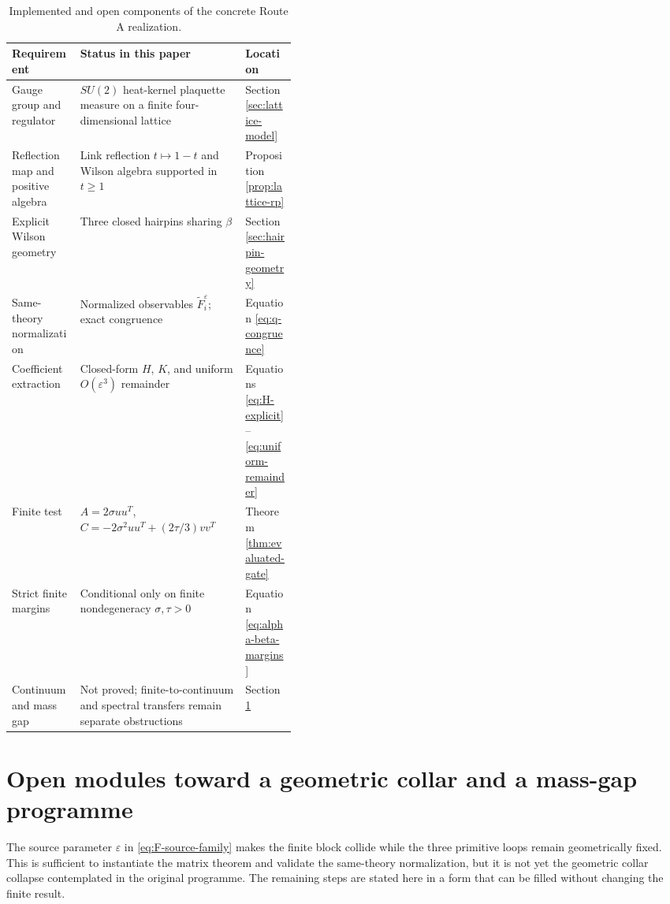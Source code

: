 \documentclass[11pt]{article}
\newcommand{\eps}{\varepsilon}
\begin{document}
\begin{table}[t]
\centering
\begin{tabularx}{\linewidth}{>{\raggedright\arraybackslash}p{0.24\linewidth}X>{\raggedright\arraybackslash}p{0.18\linewidth}}
\toprule
Requirement & Status in this paper & Location \\
\midrule
Gauge group and regulator & $SU(2)$ heat-kernel plaquette measure on a finite four-dimensional lattice & Section \ref{sec:lattice-model} \\
Reflection map and positive algebra & Link reflection $t\mapsto1-t$ and Wilson algebra supported in $t\ge1$ & Proposition \ref{prop:lattice-rp} \\
Explicit Wilson geometry & Three closed hairpins sharing $\beta$ & Section \ref{sec:hairpin-geometry} \\
Same-theory normalization & Normalized observables $\widetilde F_i^\eps$; exact congruence & Equation \eqref{eq:q-congruence} \\
Coefficient extraction & Closed-form $H$, $K$, and uniform $O(\eps^3)$ remainder & Equations \eqref{eq:H-explicit}--\eqref{eq:uniform-remainder} \\
Finite test & $A=2\sigma uu^T$, $C=-2\sigma^2uu^T+(2\tau/3)vv^T$ & Theorem \ref{thm:evaluated-gate} \\
Strict finite margins & Conditional only on finite nondegeneracy $\sigma,\tau>0$ & Equation \eqref{eq:alpha-beta-margins} \\
Continuum and mass gap & Not proved; finite-to-continuum and spectral transfers remain separate obstructions & Section \ref{sec:open-modules} \\
\bottomrule
\end{tabularx}
\caption{Implemented and open components of the concrete Route A realization.}
\label{tab:route-a-status}
\end{table}

\section{Open modules toward a geometric collar and a mass-gap programme}
\label{sec:open-modules}

The source parameter $\eps$ in \eqref{eq:F-source-family} makes the finite block collide while the three primitive loops remain geometrically fixed.  This is sufficient to instantiate the matrix theorem and validate the same-theory normalization, but it is not yet the geometric collar collapse contemplated in the original programme.  The remaining steps are stated here in a form that can be filled without changing the finite result.
\end{document}
